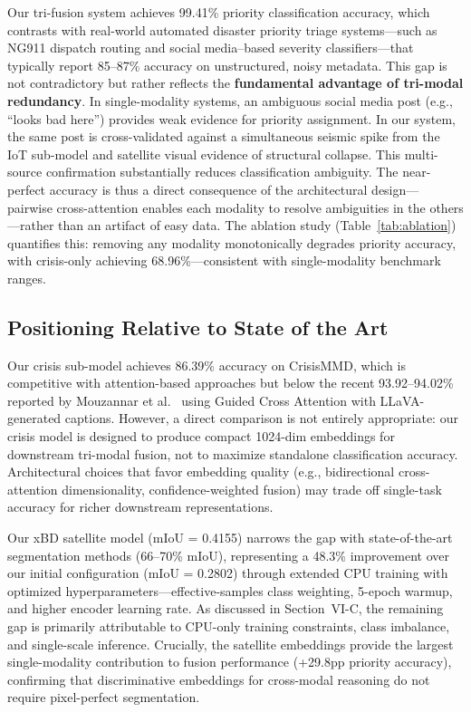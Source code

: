 \documentclass[journal]{IEEEtran}
\begin{document}
Our tri-fusion system achieves 99.41\% priority classification accuracy, which contrasts with real-world automated disaster priority triage systems---such as NG911 dispatch routing and social media--based severity classifiers---that typically report 85--87\% accuracy on unstructured, noisy metadata. This gap is not contradictory but rather reflects the \textbf{fundamental advantage of tri-modal redundancy}. In single-modality systems, an ambiguous social media post (e.g., ``looks bad here'') provides weak evidence for priority assignment. In our system, the same post is cross-validated against a simultaneous seismic spike from the IoT sub-model and satellite visual evidence of structural collapse. This multi-source confirmation substantially reduces classification ambiguity. The near-perfect accuracy is thus a direct consequence of the architectural design---pairwise cross-attention enables each modality to resolve ambiguities in the others---rather than an artifact of easy data. The ablation study (Table~\ref{tab:ablation}) quantifies this: removing any modality monotonically degrades priority accuracy, with crisis-only achieving 68.96\%---consistent with single-modality benchmark ranges.

\subsection{Positioning Relative to State of the Art}

Our crisis sub-model achieves 86.39\% accuracy on CrisisMMD, which is competitive with attention-based approaches but below the recent 93.92--94.02\% reported by Mouzannar et al.~\cite{mouzannar2025guidedcross} using Guided Cross Attention with LLaVA-generated captions. However, a direct comparison is not entirely appropriate: our crisis model is designed to produce compact 1024-dim embeddings for downstream tri-modal fusion, not to maximize standalone classification accuracy. Architectural choices that favor embedding quality (e.g., bidirectional cross-attention dimensionality, confidence-weighted fusion) may trade off single-task accuracy for richer downstream representations.

Our xBD satellite model (mIoU = 0.4155) narrows the gap with state-of-the-art segmentation methods (66--70\% mIoU), representing a 48.3\% improvement over our initial configuration (mIoU = 0.2802) through extended CPU training with optimized hyperparameters---effective-samples class weighting, 5-epoch warmup, and higher encoder learning rate. As discussed in Section~VI-C, the remaining gap is primarily attributable to CPU-only training constraints, class imbalance, and single-scale inference. Crucially, the satellite embeddings provide the largest single-modality contribution to fusion performance (+29.8pp priority accuracy), confirming that discriminative embeddings for cross-modal reasoning do not require pixel-perfect segmentation.
\end{document}
